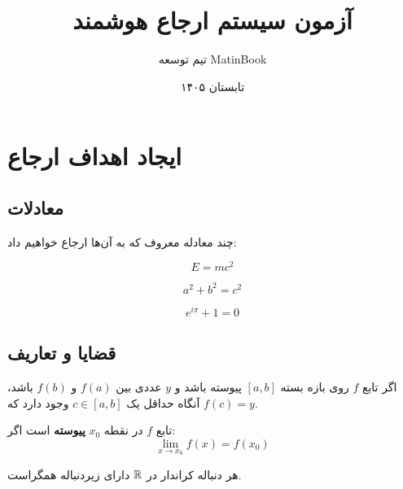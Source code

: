 \documentclass{matinbook}
\title{آزمون سیستم ارجاع هوشمند}
\author{تیم توسعه MatinBook}
\date{تابستان ۱۴۰۵}
\begin{document}
\maketitle

\chapter{ایجاد اهداف ارجاع}
\label{chap:targets}

\section{معادلات}

چند معادله معروف که به آن‌ها ارجاع خواهیم داد:

\begin{equation}
    E = mc^{2}
    \label{eq:einstein}
\end{equation}

\begin{equation}
    a^{2} + b^{2} = c^{2}
    \label{eq:pythagoras}
\end{equation}

\begin{equation}
    e^{i\pi} + 1 = 0
    \label{eq:euler}
\end{equation}

\section{قضایا و تعاریف}

\begin{theorem}
    اگر تابع $f$ روی بازه بسته $[a, b]$ پیوسته باشد و
    $y$ عددی بین $f(a)$ و $f(b)$ باشد، آنگاه
    حداقل یک $c \in [a, b]$ وجود دارد که $f(c) = y$.
    \label{thm:intermediate-value}
\end{theorem}

\begin{definition}[پیوستگی]
    تابع $f$ در نقطه $x_{0}$ \textbf{پیوسته} است اگر:
    \[
        \lim_{x \to x_{0}} f(x) = f(x_{0})
    \]
    \label{def:continuity}
\end{definition}

\begin{lemma}[لم فشردگی]
    هر دنباله کراندار در $\mathbb{R}$ دارای زیردنباله همگراست.
    \label{lem:bolzano-weierstrass}
\end{lemma}
\end{document}
